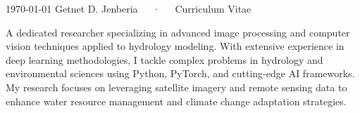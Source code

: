 \documentclass[13pt, a4paper]{awesome-cv}
\begin{document}
\makecvheader

\makecvfooter
  {\today}
  {Getnet D. Jenberia~~~·~~~Curriculum Vitae}
  {\thepage}


\begin{cvparagraph}

A dedicated researcher specializing in advanced image processing and computer vision techniques applied to hydrology modeling. With extensive experience in deep learning methodologies, I tackle complex problems in hydrology and environmental sciences using Python, PyTorch, and cutting-edge AI frameworks. My research focuses on leveraging satellite imagery and remote sensing data to enhance water resource management and climate change adaptation strategies.
\end{cvparagraph}
\end{document}

